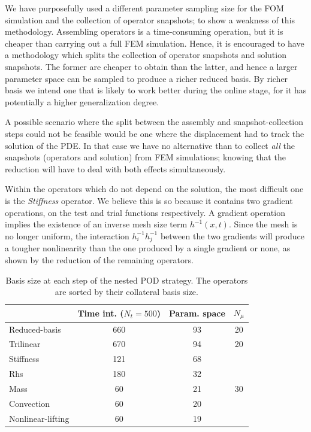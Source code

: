 \documentclass[../../thesis.tex]{subfiles}
\begin{document}
We have purposefully used a different parameter sampling size 
for the FOM simulation and the collection of operator snapshots;
to show a weakness of this methodology.
Assembling operators is a time-consuming operation, 
but it is cheaper than carrying out a full FEM simulation.
Hence, it is encouraged to have a methodology which splits the collection
of operator snapshots and solution snapshots.
The former are cheaper to obtain than the latter, 
and hence a larger parameter space can be sampled to produce a richer reduced basis.
By richer basis we intend one that is likely to work better during the online stage, 
for it has potentially a higher generalization degree.

A possible scenario where the split between the assembly and snapshot-collection steps
could not be feasible would be one where the displacement had to track the solution of the PDE.
In that case we have no alternative than to collect 
\textit{all} the snapshots (operators and solution) from FEM simulations;
knowing that the reduction will have to deal with both effects simultaneously. 

Within the operators which do not depend on the solution,
the most difficult one is the \textit{Stiffness} operator. 
We believe this is so because it contains two gradient operations,
on the test and trial functions respectively.
A gradient operation implies the existence of an inverse mesh size term \mbox{$h^{-1}(x,t)$}.
Since the mesh is no longer uniform, 
the interaction \mbox{$h_{i}^{-1} h_{j}^{-1}$} between the two gradients will produce a tougher nonlinearity
than the one produced by a single gradient or none, 
as shown by the reduction of the remaining operators.

\begin{table}[h]
    \centering
    \caption{Basis size at each step of the nested POD strategy.
    The operators are sorted by their collateral basis size.}
    \begin{tabular}{lccc}
        \toprule
        {} &  Time int. ($N_t = 500$) &  Param. space & $N_{\mu}$ \\
        \midrule
        Reduced-basis     &                     660 &          93 & 20 \\
        \midrule[0.01mm]
        Trilinear         &                     670 &          94 & 20 \\
        Stiffness         &                     121 &          68 & \multirow{5}{*}{30} \\
        Rhs               &                     180 &          32 &  \\
        Mass              &                      60 &          21 &  \\
        Convection        &                      60 &          20 &  \\
        Nonlinear-lifting &                      60 &          19 &  \\
        \bottomrule
    \end{tabular}        
    \label{tab:nlinear_disp_bases_size}
\end{table}
\end{document}
